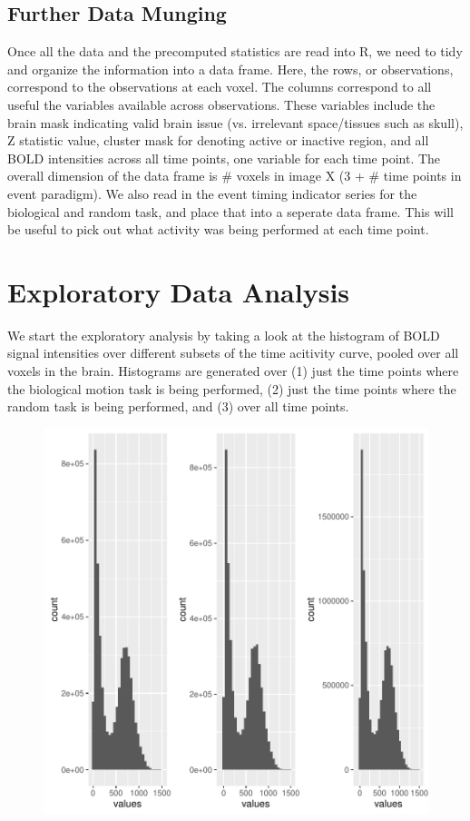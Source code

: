 \documentclass{report}
\begin{document}
\subsection{Further Data Munging}
Once all the data and the precomputed statistics are read into R, we need to tidy and organize the information into a data frame. Here, the rows, or observations, correspond to the observations at each voxel. The columns correspond to all useful the variables available across observations. These variables include the brain mask indicating valid brain issue (vs. irrelevant space/tissues such as skull), Z statistic value, cluster mask for denoting active or inactive region, and all BOLD intensities across all time points, one variable for each time point. The overall dimension of the data frame is \# voxels in image X (3 + \# time points in event paradigm). We also read in the event timing indicator series for the biological and random task, and place that into a seperate data frame. This will be useful to pick out what activity was being performed at each time point.  







\section{Exploratory Data Analysis}

We start the exploratory analysis by taking a look at the histogram of BOLD signal intensities over different subsets of the time acitivity curve, pooled over all voxels in the brain. Histograms are generated over (1) just the time points where the biological motion task is being performed, (2) just the time points where the random task is being performed, and (3) over all time points.

\begin{figure}
\includegraphics{Milestone-002}
\end{figure}
\end{document}
